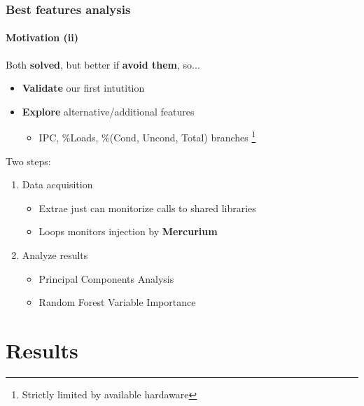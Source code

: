 \documentclass{beamer}
\begin{document}
\begin{frame}
\frametitle{Best features analysis}
\framesubtitle{Motivation (ii)}
Both \textbf{solved}, but better if \textbf{avoid them}, so...
\begin{itemize}
	\item \textbf{Validate} our first intutition
	\item \textbf{Explore} alternative/additional features
	\begin{itemize}
		\item IPC, \%Loads, \%(Cond, Uncond, Total) branches \footnote{Strictly limited by available hardaware}
	\end{itemize}
\end{itemize}
\pause
\vfill
Two steps:
\begin{enumerate}
	\item Data acquisition
	\begin{itemize}
		\item Extrae just can monitorize calls to shared libraries
		\item Loops monitors injection by \textbf{Mercurium}
	\end{itemize}
	\item Analyze results
	\begin{itemize}
		\item Principal Components Analysis
		\item Random Forest Variable Importance
	\end{itemize}
\end{enumerate}
\end{frame}


\section{Results}
\end{document}
